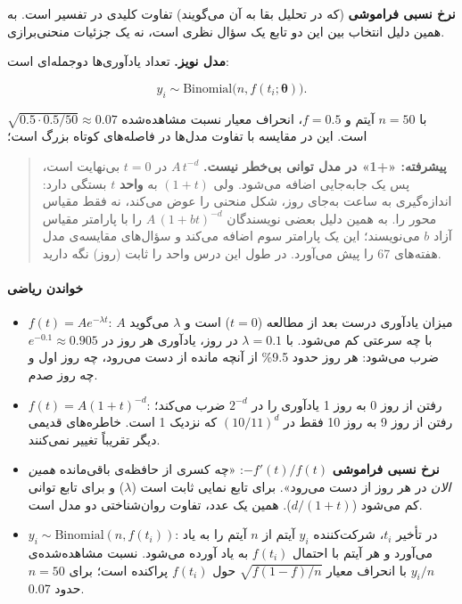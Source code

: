 \textbf{نرخ نسبی فراموشی} (که در تحلیل بقا به آن \emph{}
می‌گویند) تفاوت کلیدی در تفسیر است. به همین دلیل انتخاب بین این دو تابع
یک سؤال نظری است، نه یک جزئیات منحنی‌برازی.

\textbf{مدل نویز.} تعداد یادآوری‌ها دوجمله‌ای است:

\[
y_i \sim \mathrm{Binomial}\big(n, f(t_i; \boldsymbol\theta)\big).
\]

با \(n = 50\) آیتم و \(f = 0.5\)، انحراف معیار نسبت مشاهده‌شده
\(\sqrt{0.5 \cdot 0.5 / 50} \approx 0.07\) است. این در مقایسه با تفاوت
مدل‌ها در فاصله‌های کوتاه بزرگ است؛

\begin{quote}
\textbf{پیشرفته: «+1» در مدل توانی بی‌خطر نیست.} \(A\,t^{-d}\) در
\(t = 0\) بی‌نهایت است، پس یک جابه‌جایی اضافه می‌شود. ولی \((1 + t)\) به
\textbf{واحد} \(t\) بستگی دارد: اندازه‌گیری به ساعت به‌جای روز، شکل منحنی
را عوض می‌کند، نه فقط مقیاس محور را. به همین دلیل بعضی نویسندگان
\(A\,(1 + bt)^{-d}\) را با پارامتر مقیاس آزاد \(b\) می‌نویسند؛ این یک
پارامتر سوم اضافه می‌کند و سؤال‌های مقایسه‌ی مدل هفته‌های 6\lr{--}7 را پیش
می‌آورد. در طول این درس واحد را ثابت (روز) نگه دارید.
\end{quote}

\paragraph{خواندن ریاضی}

\begin{itemize}
\tightlist
\item
  \(f(t) = A e^{-\lambda t}\): \(A\) میزان یادآوری درست بعد از مطالعه
  (\(t = 0\)) است و \(\lambda\) می‌گوید با چه سرعتی کم می‌شود. با
  \(\lambda = 0.1\) در روز، یادآوری هر روز در \(e^{-0.1} \approx 0.905\)
  ضرب می‌شود: هر روز حدود 9.5\% از آنچه مانده از دست می‌رود، چه روز اول و
  چه روز صدم.
\item
  \(f(t) = A(1+t)^{-d}\): رفتن از روز 0 به روز 1 یادآوری را در
  \(2^{-d}\) ضرب می‌کند؛ رفتن از روز 9 به روز 10 فقط در \((10/11)^{d}\)
  که نزدیک 1 است. خاطره‌های قدیمی دیگر تقریباً تغییر نمی‌کنند.
\item
  \textbf{نرخ نسبی فراموشی} \(-f'(t)/f(t)\): «چه کسری از حافظه‌ی
  باقی‌مانده \emph{همین الان} در هر روز از دست می‌رود». برای تابع نمایی
  ثابت است (\(\lambda\)) و برای تابع توانی کم می‌شود (\(d/(1+t)\)). همین
  یک عدد، تفاوت روان‌شناختی دو مدل است.
\item
  \(y_i \sim \mathrm{Binomial}(n,\allowbreak f(t_i))\): در تأخیر \(t_i\)، شرکت‌کننده
  \(y_i\) آیتم از \(n\) آیتم را به یاد می‌آورد و هر آیتم با احتمال
  \(f(t_i)\) به یاد آورده می‌شود. نسبت مشاهده‌شده‌ی \(y_i/n\) با انحراف
  معیار \(\sqrt{f(1-f)/n}\) حول \(f(t_i)\) پراکنده است؛ برای \(n = 50\)
  حدود 0.07.
\end{itemize}

